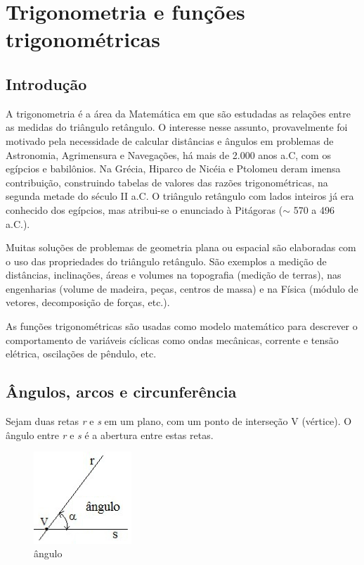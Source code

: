 \chapter{Trigonometria e funções trigonométricas}

\section{Introdução}

A trigonometria é a área da Matemática em que são estudadas as relações entre as medidas do triângulo retângulo. O interesse nesse assunto, provavelmente foi motivado pela necessidade de calcular distâncias e ângulos em problemas de Astronomia, Agrimensura e Navegações, há mais de 2.000 anos a.C, com os egípcios e babilônios. Na Grécia, Hiparco de Nicéia e Ptolomeu deram imensa contribuição, construindo tabelas de valores das razões trigonométricas, na segunda metade do século II a.C. O triângulo retângulo com lados inteiros já era conhecido dos egípcios, mas atribui-se o enunciado à Pitágoras ($ \sim $  570 a 496 a.C.). 

Muitas soluções de problemas de geometria plana ou espacial são elaboradas com o uso das propriedades do triângulo retângulo. São exemplos a medição de distâncias, inclinações, áreas e volumes na topografia (medição de terras), nas engenharias (volume de madeira, peças, centros de massa) e na Física (módulo de vetores, decomposição de forças, etc.).

As funções trigonométricas são usadas como modelo matemático para descrever o comportamento de variáveis cíclicas como ondas mecânicas, corrente e tensão elétrica, oscilações de pêndulo, etc.

\section{Ângulos, arcos e circunferência }

\begin{caixa}

\begin{tdefinicao}
    Sejam duas retas \textit{r} e \textit{s} em um plano, com um ponto de interseção V (vértice). O ângulo entre \textit{r} e \textit{s} é a abertura entre estas retas.
\end{tdefinicao}

\end{caixa}

\begin{figure}[H]
    \begin{Center}
        \includegraphics[width=1.45in,height=1.36in]{capitulos/trigonometria_e_funcoes_trigonometricas/media/image2.png}
    \end{Center}
    \caption{ângulo}
\end{figure}

